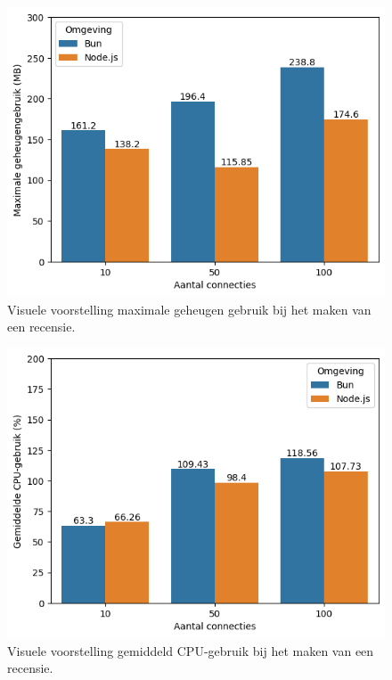     \begin{figure}[H]
      \centering
      \includegraphics[width=0.7\columnwidth]{graphics/PostMySqlRAM.png}
      \caption{\label{fig:postgeheugenmysql}Visuele voorstelling maximale geheugen gebruik bij het maken van een recensie.}
    \end{figure}
    \begin{figure}[H]
      \centering
      \includegraphics[width=0.7\columnwidth]{graphics/PostMySqlCpu.png}
      \caption{\label{fig:postcpumysql}Visuele voorstelling gemiddeld CPU-gebruik bij het maken van een recensie.}
    \end{figure}
